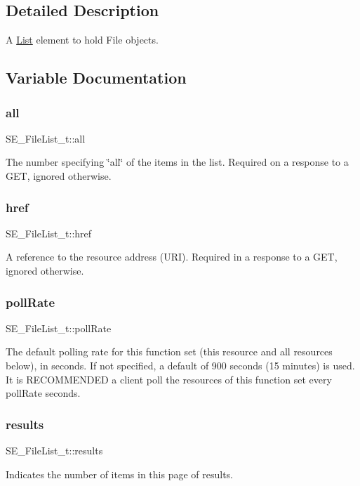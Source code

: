 \subsection{Detailed Description}
A \hyperlink{structList}{List} element to hold File objects. 

\subsection{Variable Documentation}
\mbox{\label{group__FileList_ga3c96b7591e75f2ba60753bd7e7b706e5}} 
\subsubsection{\texorpdfstring{all}{all}}
{\footnotesize\ttfamily S\+E\+\_\+\+File\+List\+\_\+t\+::all}

The number specifying \char`\"{}all\char`\"{} of the items in the list. Required on a response to a G\+ET, ignored otherwise. \mbox{\label{group__FileList_ga7ddecb44b6b65daa5a5324c09a396853}} 
\subsubsection{\texorpdfstring{href}{href}}
{\footnotesize\ttfamily S\+E\+\_\+\+File\+List\+\_\+t\+::href}

A reference to the resource address (U\+RI). Required in a response to a G\+ET, ignored otherwise. \mbox{\label{group__FileList_ga27aa967b9be8765b2407b51ba6e3e65e}} 
\subsubsection{\texorpdfstring{poll\+Rate}{pollRate}}
{\footnotesize\ttfamily S\+E\+\_\+\+File\+List\+\_\+t\+::poll\+Rate}

The default polling rate for this function set (this resource and all resources below), in seconds. If not specified, a default of 900 seconds (15 minutes) is used. It is R\+E\+C\+O\+M\+M\+E\+N\+D\+ED a client poll the resources of this function set every poll\+Rate seconds. \mbox{\label{group__FileList_gaac837f0b9ccb09e669a79138ff5fc4b4}} 
\subsubsection{\texorpdfstring{results}{results}}
{\footnotesize\ttfamily S\+E\+\_\+\+File\+List\+\_\+t\+::results}

Indicates the number of items in this page of results. 